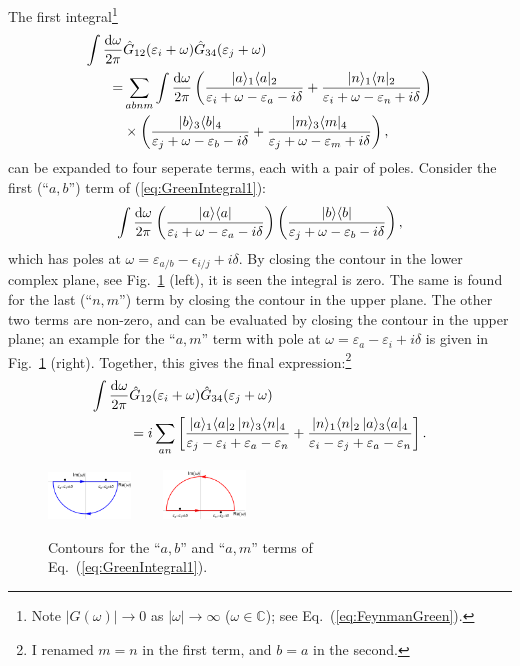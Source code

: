 \documentclass[10pt,twocolumn,a4paper]{article}%
\newcommand{\bra}[1]{\ensuremath{\langle #1|}}	%
\newcommand{\ket}[1]{\ensuremath{|#1\rangle}}	%
\newcommand{\be}{\begin{equation}}
\newcommand{\ee}{\end{equation}}
\def\d{\ensuremath{{\rm d}}}
\def\e{\ensuremath{\epsilon}}
\def\en{\ensuremath{\varepsilon}}
\newcommand{\w}{\ensuremath{\omega}}
\begin{document}
The first integral\footnote{Note $|G(\w)|\to0$ as $|\w|\to\infty$ ($\w\in\mathbb{C}$); see Eq.~(\ref{eq:FeynmanGreen}).}
\begin{align}
\int \frac{\d \w}{2\pi}&\hat G_{12}(\en_i+\w) \hat G_{34}(\en_j + \omega)\\
=&\sum_{abnm}\int \frac{\d \w}{2\pi} \left(
\frac{\ket{a}_1\bra{a}_2}{\en_i+\w-\en_a-i\delta} + \frac{\ket{n}_1\bra{n}_2}{\en_i+\w-\en_n+i\delta}
\right)
\notag\\&\times
\left(
\frac{\ket{b}_3\bra{b}_4}{\en_j+\w-\en_b-i\delta} + \frac{\ket{m}_3\bra{m}_4}{\en_j+\w-\en_m+i\delta}
\right),
\label{eq:GreenIntegral1}
\end{align}
can be expanded to four seperate terms, each with a pair of poles.
%
Consider the first (``$a,b$'') term of (\ref{eq:GreenIntegral1}):
\be
\int \frac{\d \w}{2\pi} \left(
\frac{\ket{a}\bra{a}}{\en_i+\w-\en_a-i\delta}
\right)
\left(
\frac{\ket{b}\bra{b}}{\en_j+\w-\en_b-i\delta}
\right),
\ee
which has poles at $\w=\en_{a/b}-\e_{i/j}+i\delta$.
By closing the contour in the lower complex plane, see Fig.~\ref{fig:contour} (left), it is seen the integral is zero.
The same is found for the last (``$n,m$'') term by closing the contour in the upper plane.
The other two terms are non-zero, and can be evaluated by closing the contour in the upper plane; an example for the ``$a,m$'' term with pole at $\w=\en_a-\en_i+i\delta$ is given in Fig.~\ref{fig:contour} (right).
Together, this gives the final expression:\footnote{I renamed $m=n$ in the first term, and $b=a$ in the second.}
\begin{align}
\int \frac{\d \w}{2\pi}&\hat G_{12}(\en_i+\w) \hat G_{34}(\en_j + \omega)\notag\\
&=
i\sum_{an}\left[
\frac{\ket{a}_1\bra{a}_2 \, \ket{n}_3\bra{n}_4}{\en_j-\en_i+\en_a-\en_n}
+
\frac{\ket{n}_1\bra{n}_2 \, \ket{a}_3\bra{a}_4}{\en_i-\en_j+\en_a-\en_n}
\right].\label{eq:GreenInt1}
\end{align}



\begin{figure}%
\centering
\includegraphics[width=0.195\textwidth]{img/contour_1}~~~~
\includegraphics[width=0.195\textwidth]{img/contour_2}
\caption{\small Contours for the ``$a,b$'' and ``$a,m$'' terms of Eq.~(\ref{eq:GreenIntegral1}).\label{fig:contour}}
\end{figure}
\end{document}
